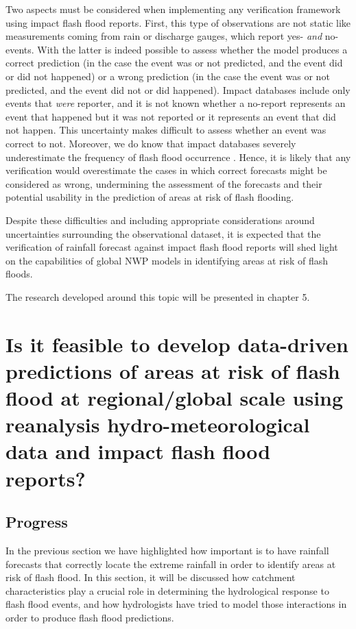 Two aspects must be considered when implementing any verification framework using impact flash flood reports. First, this type of observations are not static like measurements coming from rain or discharge gauges, which report yes- \textit{and} no-events. With the latter is indeed possible to assess whether the model produces a correct prediction (in the case the event was or not predicted, and the event did or did not happened) or a wrong prediction (in the case the event was or not predicted, and the event did not or did happened). Impact databases include only events that \textit{were} reporter, and it is not known whether a no-report represents an event that happened but it was not reported or it represents an event that did not happen. This uncertainty makes difficult to assess whether an event was correct to not. Moreover, we do know that impact databases severely underestimate the frequency of flash flood occurrence \citep{Panwar_2020}. Hence, it is likely that any verification would overestimate the cases in which correct forecasts might be considered as wrong, undermining the assessment of the forecasts and their potential usability in the prediction of areas at risk of flash flooding. 

Despite these difficulties and including appropriate considerations around uncertainties surrounding the observational dataset, it is expected that the verification of rainfall forecast against impact flash flood reports will shed light on the capabilities of global NWP models in identifying areas at risk of flash floods. 

The research developed around this topic will be presented in chapter 5. 


\section{Is it feasible to develop data-driven predictions of areas at risk of flash flood at regional/global scale using reanalysis hydro-meteorological data and impact flash flood reports?}

\subsection{Progress}

In the previous section we have highlighted how important is to have rainfall forecasts that correctly locate the extreme rainfall in order to identify areas at risk of flash flood. In this section, it will be discussed how catchment characteristics play a crucial role in determining the hydrological response to flash flood events, and how hydrologists have tried to model those interactions in order to produce flash flood predictions. 

